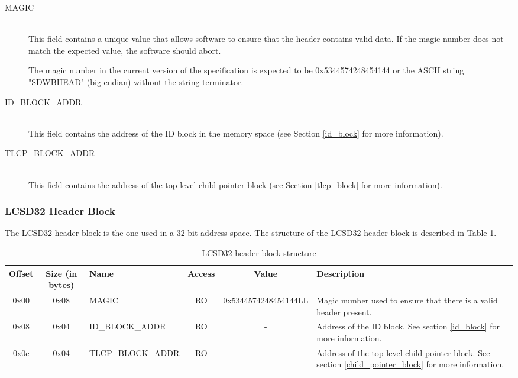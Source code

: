 \documentclass{article}
\begin{document}
\begin{description}
\item[MAGIC] \hfill \\
This field contains a unique value that allows software to ensure that
the header contains valid data. If the magic number does not match the
expected value, the software should abort.

The magic number in the current version of the specification is expected to
be 0x5344574248454144 or the ASCII string "SDWBHEAD" (big-endian) without the
string terminator.

\item[ID\_BLOCK\_ADDR] \hfill \\
This field contains the address of the ID block in the memory space (see Section
\ref{id_block} for more information).

\item[TLCP\_BLOCK\_ADDR] \hfill \\
This field contains the address of the top level child pointer block (see Section
\ref{tlcp_block} for more information).
\end{description}

\subsubsection{LCSD32 Header Block}
The LCSD32 header block is the one used in a 32 bit address space. The structure
of the LCSD32 header block is described in Table \ref{hdr_block_struct}.

\begin{center}
  \begin{savenotes}
    \begin{table}[!ht]\footnotesize
      \caption{LCSD32 header block structure}\label{hdr_block_struct}\centering
      \begin{tabular}{| c | c | l | c | c | p{5cm} |} \hline
      Offset & Size (in bytes) & Name & Access & Value & Description \\ \hline
      0x00 & 0x08 & MAGIC & RO & 0x5344574248454144LL & Magic number used to ensure that there is a valid header present. \\ \hline
      0x08 & 0x04 & ID\_BLOCK\_ADDR & RO & - & Address of the ID block. See section \ref{id_block} for more information. \\ \hline
      0x0c & 0x04 & TLCP\_BLOCK\_ADDR & RO & - & Address of the top-level child pointer block. See section \ref{child_pointer_block} for more information. \\ \hline
      \end{tabular}
    \end{table}
  \end{savenotes}
\end{center}
\end{document}
